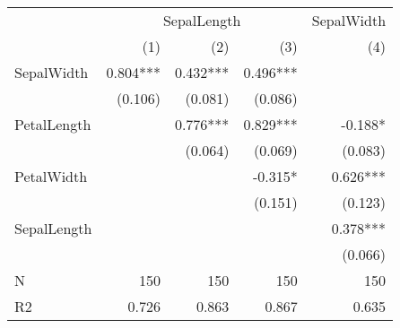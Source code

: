 \begin{tabular}{lrrrr}
\toprule
            & \multicolumn{3}{c}{SepalLength} & \multicolumn{1}{c}{SepalWidth} \\ 
\cmidrule(lr){2-4} \cmidrule(lr){5-5} 
            &      (1) &      (2) &       (3) &                            (4) \\ 
\midrule
SepalWidth  & 0.804*** & 0.432*** &  0.496*** &                                \\ 
            &  (0.106) &  (0.081) &   (0.086) &                                \\ 
PetalLength &          & 0.776*** &  0.829*** &                        -0.188* \\ 
            &          &  (0.064) &   (0.069) &                        (0.083) \\ 
PetalWidth  &          &          &   -0.315* &                       0.626*** \\ 
            &          &          &   (0.151) &                        (0.123) \\ 
SepalLength &          &          &           &                       0.378*** \\ 
            &          &          &           &                        (0.066) \\ 
\midrule
N           &      150 &      150 &       150 &                            150 \\ 
R2          &    0.726 &    0.863 &     0.867 &                          0.635 \\ 
\bottomrule
\end{tabular}
